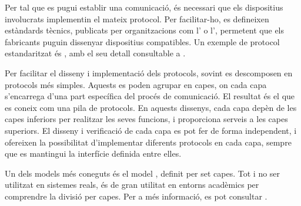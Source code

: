\documentclass{tfgitic}[2024/07/01]
\begin{document}
Per tal que es pugui establir una comunicació, és necessari que els dispositius involucrats implementin el mateix protocol. Per facilitar-ho, es defineixen estàndards tècnics, publicats per organitzacions com l' o l', permetent que els fabricants puguin dissenyar dispositius compatibles. Un exemple de protocol estandaritzat és , amb el seu detall consultable a \cite{fielding_hypertext_2014}.

Per facilitar el disseny i implementació dels protocols, sovint es descomposen en protocols més simples. Aquests es poden agrupar en capes, on cada capa s'encarrega d'una part específica del procés de comunicació. El resultat és el que es coneix com una pila de protocols. 
En aquests dissenys, cada capa depèn de les capes inferiors per realitzar les seves funcions, i proporciona serveis a les capes superiors. El disseny i verificació de cada capa es pot fer de forma independent, i ofereixen la possibilitat d'implementar diferents protocols en cada capa, sempre que es mantingui la interfície definida entre elles.

Un dels models més coneguts és el model , definit per set capes. Tot i no ser utilitzat en sistemes reals, és de gran utilitat en entorns acadèmics per comprendre la divisió per capes. Per a més informació, es pot consultar \cite{noauthor_isoiec_1994}.
\end{document}
